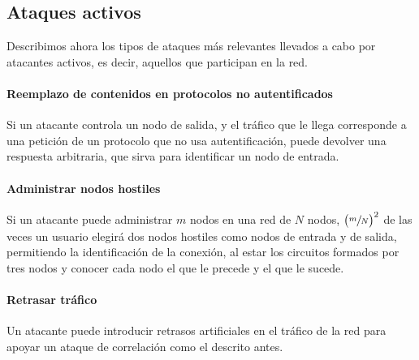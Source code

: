 \documentclass[
  a4paper,
  12pt,
  spanish,
]{scrartcl}
\begin{document}
\subsection{Ataques activos}

Describimos ahora los tipos de ataques más relevantes llevados a cabo por atacantes activos, es decir, aquellos que participan en la red.

\paragraph{Reemplazo de contenidos en protocolos no autentificados}

Si un atacante controla un nodo de salida, y el tráfico que le llega corresponde a una petición
de un protocolo que no usa autentificación, puede devolver una respuesta arbitraria, que sirva para
identificar un nodo de entrada.

\paragraph{Administrar nodos hostiles}

Si un atacante puede administrar $m$ nodos en una red de $N$ nodos, $\left(\sfrac{m}{N}\right)^2$ de las veces
un usuario elegirá dos nodos hostiles como nodos de entrada y de salida, permitiendo la identificación de la conexión,
al estar los circuitos formados por tres nodos y conocer cada nodo el que le precede y el que le sucede.

\paragraph{Retrasar tráfico}

Un atacante puede introducir retrasos artificiales en el tráfico de la red para
apoyar un ataque de correlación como el descrito antes.


\newpage
\printbibliography
\end{document}
